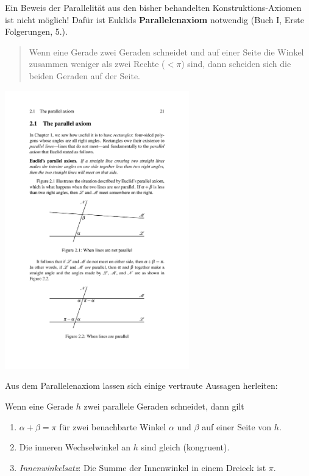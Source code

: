 Ein Beweis der Parallelität aus den bisher behandelten
Konstruktions-Axiomen ist nicht möglich! %
Dafür ist Euklids {\bf Parallelenaxiom} notwendig (Buch I, Erste
Folgerungen, 5.).
\begin{quote}
Wenn eine Gerade %
zwei Geraden %
schneidet und auf einer Seite die Winkel
zusammen weniger als zwei Rechte ($<\pi$) sind, dann scheiden sich die
beiden Geraden auf der Seite.
\end{quote}



\centerline{\includegraphics[width=8cm]{BILDER/BildParallelenaxiom.pdf}}



Aus dem Parallelenaxiom lassen sich einige vertraute Aussagen herleiten:


\begin{thm}
Wenn eine Gerade $h$ zwei parallele Geraden %
schneidet, dann gilt 
\begin{enumerate}
\item
$\alpha + \beta = \pi$
für zwei benachbarte Winkel $\alpha$ und $\beta$  auf einer
Seite von $h$. %

\item
Die inneren Wechselwinkel an $h$ sind gleich (kongruent).

\item
{\em Innenwinkelsatz}: Die Summe der Innenwinkel in einem Dreieck ist $\pi$. %

\end{enumerate}
\end{thm}



